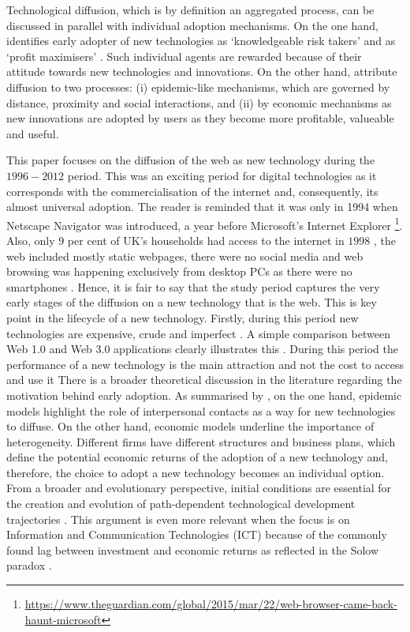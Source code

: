 \documentclass[
  authoryear,
  preprint,
  3p]{elsarticle}
\begin{document}
Technological diffusion, which is by definition an aggregated process,
can be discussed in parallel with individual adoption mechanisms. On the
one hand, \citet{rogers2010diffusion} identifies early adopter of new
technologies as `knowledgeable risk takers' and \citet{griliches1957} as
`profit maximisers' \citep{ding2010modeling}. Such individual agents are
rewarded because of their attitude towards new technologies and
innovations. On the other hand, \citet{perkins2011internet} attribute
diffusion to two processes: (i) epidemic-like mechanisms, which are
governed by distance, proximity and social interactions, and (ii) by
economic mechanisms as new innovations are adopted by users as they
become more profitable, valueable and useful.

This paper focuses on the diffusion of the web as new technology during
the \(1996-2012\) period. This was an exciting period for digital
technologies as it corresponds with the commercialisation of the
internet and, consequently, its almost universal adoption. The reader is
reminded that it was only in 1994 when Netscape Navigator was
introduced, a year before Microsoft's Internet Explorer \footnote{\url{https://www.theguardian.com/global/2015/mar/22/web-browser-came-back-haunt-microsoft}}.
Also, only \(9\) per cent of UK's households had access to the internet
in \(1998\) \citep{ons2018}, the web included mostly static webpages,
there were no social media and web browsing was happening exclusively
from desktop PCs as there were no smartphones \citep{tranosuk}. Hence,
it is fair to say that the study period captures the very early stages
of the diffusion on a new technology that is the web. This is key point
in the lifecycle of a new technology. Firstly, during this period new
technologies are expensive, crude and imperfect
\citep{rosenberg1994exploring, wilson201281}. A simple comparison
between Web 1.0 and Web 3.0 applications clearly illustrates this
\citep{tranos2020social}. During this period the performance of a new
technology is the main attraction and not the cost to access and use it
\citep{wilson2011lessons} There is a broader theoretical discussion in
the literature regarding the motivation behind early adoption. As
summarised by \citet{perkins2005international}, on the one hand,
epidemic models highlight the role of interpersonal contacts as a way
for new technologies to diffuse. On the other hand, economic models
underline the importance of heterogeneity. Different firms have
different structures and business plans, which define the potential
economic returns of the adoption of a new technology and, therefore, the
choice to adopt a new technology becomes an individual option. From a
broader and evolutionary perspective, initial conditions are essential
for the creation and evolution of path-dependent technological
development trajectories \citep{neffke2011regions, simmie2014new}. This
argument is even more relevant when the focus is on Information and
Communication Technologies (ICT) because of the commonly found lag
between investment and economic returns as reflected in the Solow
paradox \citep{acemoglu2014return, brynjolfsson2018artificial}.
\end{document}
